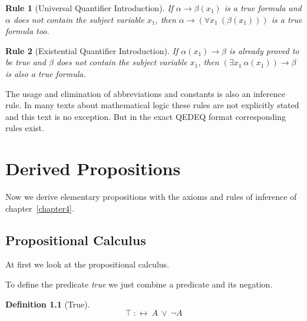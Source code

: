 \documentclass[a4paper,german,10pt,twoside]{book}
\newtheorem{rul}{Rule}
\theoremstyle{definition}
\newtheorem{defn}[thm]{Definition}
\theoremstyle{remark}
\begin{document}
\par


\begin{rul}[Universal Quantifier Introduction]
\label{rule:universalIntroduction} \hypertarget{rule:universalIntroduction}{}
If $\alpha \rightarrow \beta(x_1)$ is a true formula and $\alpha$ does not contain the subject variable $x_1$, then $\alpha \rightarrow (\forall x_1~(\beta(x_1)))$ is a true formula too.
\end{rul}




\par


\begin{rul}[Existential Quantifier Introduction]
\label{rule:existentialIntroduction} \hypertarget{rule:existentialIntroduction}{}
If $\alpha(x_1) \rightarrow \beta$ is already proved to be true and $\beta$ does not contain the subject variable $x_1$, then $(\exists x_1~\alpha(x_1)) \rightarrow \beta$ is also a true formula.
\end{rul}




The usage and elimination of abbreviations and constants is also an inference rule. In many texts about mathematical logic these rules are not explicitly stated and this text is no exception. But in the exact QEDEQ format corresponding rules exist.




\chapter{Derived Propositions} \label{chapter5} \hypertarget{chapter5}{}

Now we derive elementary propositions with the axioms and rules of inference of chapter~\ref{chapter4}.

\section{Propositional Calculus} \label{chapter5_section0} \hypertarget{chapter5_section0}{}
At first we look at the propositional calculus.

\par
To define the predicate \emph{true} we just combine a predicate and its negation.

\begin{defn}[True]
\label{definition:True} \hypertarget{definition:True}{}
$$\top\ :\leftrightarrow \ A\ \lor \ \neg A$$

\end{defn}
\end{document}
